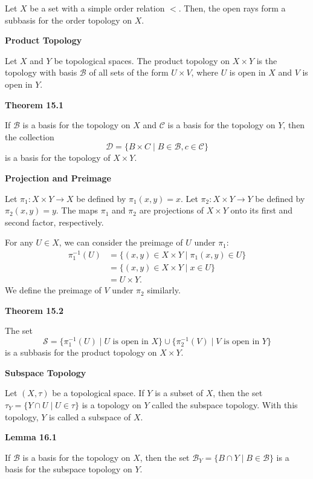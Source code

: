 \documentclass{article}
\newcommand{\inv}{^{-1}}
\newcommand{\B}{\mathcal B}
\begin{document}
    Let $X$ be a set with a simple order relation $<$. Then, the open rays form a subbasis for the order topology on $X$.

\medskip\noindent\textbf{Product Topology}

    Let $X$ and $Y$ be topological spaces. The product topology on $X \times Y$ is the topology with basis $\B$ of all sets of the form $U \times V$, where $U$ is open in $X$ and $V$ is open in $Y$.

\medskip\noindent\textbf{Theorem 15.1}

    If $\B$ is a basis for the topology on $X$ and $\mathcal C$ is a basis for the topology on $Y$, then the collection $$\mathcal D = \{B \times C \mid B \in \B, c \in \mathcal C\}$$ is a basis for the topology of $X \times Y$.

\medskip\noindent\textbf{Projection and Preimage}

    Let $\pi_1: X \times Y \to X$ be defined by $\pi_1(x,y) = x$.
    Let $\pi_2: X \times Y \to Y$ be defined by $\pi_2(x,y) = y$.
    The maps $\pi_1$ and $\pi_2$ are projections of $X \times Y$ onto its first and second factor, respectively.

    For any $U \in X$, we can consider the preimage of $U$ under $\pi_1$:
    \begin{align*}
        \pi_1\inv(U) &= \{(x,y) \in X \times Y \mid \pi_1(x,y) \in U\} \\
                     &= \{(x,y) \in X \times Y \mid x \in U\} \\
                     &= U \times Y.
    \end{align*}
    We define the preimage of $V$ under $\pi_2$ similarly.

\medskip\noindent\textbf{Theorem 15.2}

    The set $$\mathcal S = \{\pi_1\inv(U) \mid U \text{ is open in } X\} \cup \{\pi_2\inv(V) \mid V \text{ is open in } Y\}$$ is a subbasis for the product topology on $X \times Y$.

\medskip\noindent\textbf{Subspace Topology}

    Let $(X,\tau)$ be a topological space. If $Y$ is a subset of $X$, then the set $\tau_Y = \{Y \cap U \mid U \in \tau\}$ is a topology on $Y$ called the subspace topology. With this topology, $Y$ is called a subspace of $X$.

\medskip\noindent\textbf{Lemma 16.1}

    If $\B$ is a basis for the topology on $X$, then the set $\B_Y = \{B \cap Y \mid B \in \B\}$ is a basis for the subspace topology on $Y$.
\end{document}
